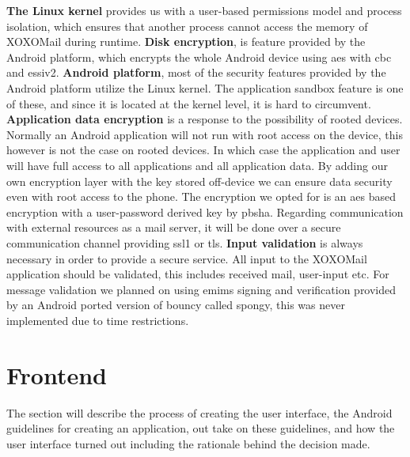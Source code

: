 \textbf{The Linux kernel} provides us with a user-based permissions model and process isolation, which ensures that another process cannot access the memory of XOXOMail during runtime.
\newline
\newline
\textbf{Disk encryption}, is feature provided by the Android platform, which encrypts the whole Android device using \gls{aes} with \gls{cbc} and \gls{essiv2}.\cite{bib:crypto}
\newline
\newline
\textbf{Android platform}, most of the security features provided by the Android platform utilize the Linux kernel. The application sandbox feature is one of these, and since it is located at the kernel level, it is hard to circumvent.
\newline
\newline
\textbf{Application data encryption} is a response to the possibility of rooted devices. Normally an Android application will not run with root access on the device, this however is not the case on rooted devices. In which case the application and user will have full access to all applications and all application data. By adding our own encryption layer with the key stored off-device we can ensure data security even with root access to the phone\cite{bib:tech}. The encryption we opted for is an \gls{aes} based encryption with a user-password derived key by \gls{pbsha}.
Regarding communication with external resources as a mail server, it will be done over a secure communication channel providing \gls{ssl1} or \gls{tls}. 
\newline
\newline
\textbf{Input validation} is always necessary in order to provide a secure service. All input to the XOXOMail application should be validated, this includes received mail, user-input etc. For message validation we planned on using \gls{emims} signing and verification provided by an Android ported version of \gls{bouncy} called \gls{spongy}, this was never implemented due to time restrictions. 

\newpage

\section{Frontend}
The section will describe the process of creating the user interface, the Android guidelines for creating an application, out take on these guidelines, and how the user interface turned out including the rationale behind the decision made.

